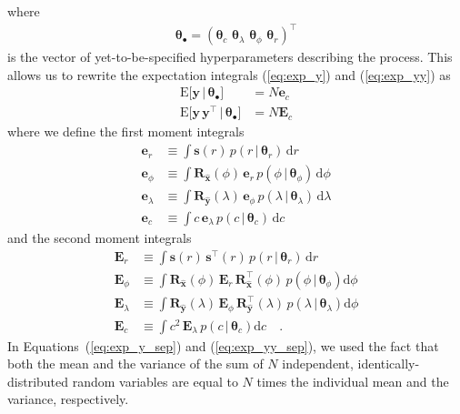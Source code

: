 \documentclass[modern]{aastex62}
\begin{document}
%
where
%
\begin{align}
    \pmb{\theta}_\bullet = \left(
    \pmb{\theta}_{c} \, \,
    \pmb{\theta}_{\lambda} \, \,
    \pmb{\theta}_{\phi} \, \,
    \pmb{\theta}_{r} \right)^\top
\end{align}
%
is the vector of yet-to-be-specified hyperparameters describing the process.
%
This allows us to rewrite the expectation integrals (\ref{eq:exp_y})
and (\ref{eq:exp_yy}) as
%
\begin{align}
    \label{eq:exp_y_sep}
    \mathrm{E} \Big[ \mathbf{y} \, \Big| \, \pmb{\theta}_\bullet \Big]
     & =
    N \mathbf{e}_c
    \\[1em]
    \label{eq:exp_yy_sep}
    \mathrm{E} \Big[ \mathbf{y} \, \mathbf{y}^\top \, \Big| \, \pmb{\theta}_\bullet \Big]
     & =
    N \mathbf{E}_c
\end{align}
%
where we define the first moment integrals
%
\begin{align}
    \label{eq:e1}
    \mathbf{e}_r
     & \equiv
    \int
    \mathbf{s}(r) \,
    p(r \, \big| \, \pmb{\theta}_{r}) \,
    \mathrm{d}r
    \\[1em]
    \label{eq:e2}
    \mathbf{e}_\phi
     & \equiv
    \int
    \mathbf{R}_{\hat{\mathbf{x}}}(\phi) \,
    \mathbf{e}_r \,
    p(\phi \, \big| \, \pmb{\theta}_{\phi}) \,
    \mathrm{d}\phi
    \\[1em]
    \label{eq:e3}
    \mathbf{e}_\lambda
     & \equiv
    \int
    \mathbf{R}_{\hat{\mathbf{y}}}(\lambda) \,
    \mathbf{e}_\phi \,
    p(\lambda \, \big| \, \pmb{\theta}_{\lambda}) \,
    \mathrm{d}\lambda
    \\[1em]
    \label{eq:e4}
    \mathbf{e}_c
     & \equiv
    \int
    c \,
    \mathbf{e}_\lambda \,
    p(c \, \big| \, \pmb{\theta}_{c}) \,
    \mathrm{d}c
\end{align}
%
and the second moment integrals
%
\begin{align}
    \label{eq:E1}
    \mathbf{E}_r
     & \equiv
    \int
    \mathbf{s}(r) \, \mathbf{s}^\top(r) \,
    p(r \, \big| \, \pmb{\theta}_{r}) \,
    \mathrm{d}r
    \\[1em]
    \label{eq:E2}
    \mathbf{E}_\phi
     & \equiv
    \int
    \mathbf{R}_{\hat{\mathbf{x}}}(\phi) \,
    \mathbf{E}_r \,
    \mathbf{R}_{\hat{\mathbf{x}}}^\top(\phi) \,
    p(\phi \, \big| \, \pmb{\theta}_{\phi})
    \mathrm{d}\phi
    \\[1em]
    \label{eq:E3}
    \mathbf{E}_\lambda
     & \equiv
    \int
    \mathbf{R}_{\hat{\mathbf{y}}}(\lambda) \,
    \mathbf{E}_\phi \,
    \mathbf{R}_{\hat{\mathbf{y}}}^\top(\lambda) \,
    p(\lambda \, \big| \, \pmb{\theta}_{\lambda})
    \mathrm{d}\phi
    \\[1em]
    \label{eq:E4}
    \mathbf{E}_c
     & \equiv
    \int
    c^2 \,
    \mathbf{E}_\lambda \,
    p(c \, \big| \, \pmb{\theta}_c)
    \mathrm{d}c
    \quad.
\end{align}
%
In Equations~(\ref{eq:exp_y_sep}) and (\ref{eq:exp_yy_sep}), we used the fact
that both the mean and the variance of the sum of $N$
independent, identically-distributed random variables are equal to $N$
times the individual mean and the variance, respectively.
\end{document}
